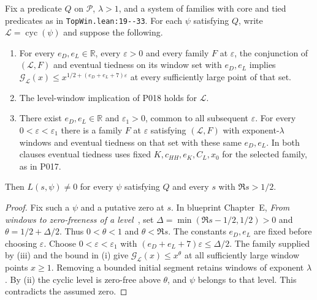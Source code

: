 
\begin{theorem}\label{pn:P019}
Fix a predicate $Q$ on $\mathcal P$, $\lambda>1$, and a system of families with core and tied predicates as in \nolinkurl{TopWin.lean:19--33}. For each $\psi$ satisfying $Q$, write $\mathcal L=\operatorname{cyc}(\psi)$ and suppose the following.
\begin{enumerate}
\item For every $e_D,e_L\in\mathbb R$, every $\varepsilon>0$ and every family $F$ at $\varepsilon$, the conjunction of $(\mathcal L,F)$ and eventual tiedness on its window set with $e_D,e_L$ implies $\mathcal G_{\mathcal L}(x)\le x^{1/2+(e_D+e_L+7)\varepsilon}$ at every sufficiently large point of that set.
\item The level-window implication of P018 holds for $\mathcal L$.
\item There exist $e_D,e_L\in\mathbb R$ and $\varepsilon_1>0$, common to all subsequent $\varepsilon$. For every $0<\varepsilon<\varepsilon_1$ there is a family $F$ at $\varepsilon$ satisfying $(\mathcal L,F)$ with exponent-$\lambda$ windows and eventual tiedness on that set with these same $e_D,e_L$. In both clauses eventual tiedness uses fixed $K,c_{HH},e_K,C_L,x_0$ for the selected family, as in P017.
\end{enumerate}
Then $L(s,\psi)\ne0$ for every $\psi$ satisfying $Q$ and every $s$ with $\Re s>1/2$.
\end{theorem}
\begin{proof}
Fix such a $\psi$ and a putative zero at $s$. In blueprint Chapter~E, \emph{From windows to zero-freeness of a level}~, set $\Delta=\min(\Re s-1/2,1/2)>0$ and $\theta=1/2+\Delta/2$. Thus $0<\theta<1$ and $\theta<\Re s$. The constants $e_D,e_L$ are fixed before choosing $\varepsilon$. Choose $0<\varepsilon<\varepsilon_1$ with $(e_D+e_L+7)\varepsilon\le\Delta/2$. The family supplied by (iii) and the bound in (i) give $\mathcal G_{\mathcal L}(x)\le x^\theta$ at all sufficiently large window points $x\ge1$. Removing a bounded initial segment retains windows of exponent $\lambda$. By (ii) the cyclic level is zero-free above $\theta$, and $\psi$ belongs to that level. This contradicts the assumed zero.
\end{proof}
